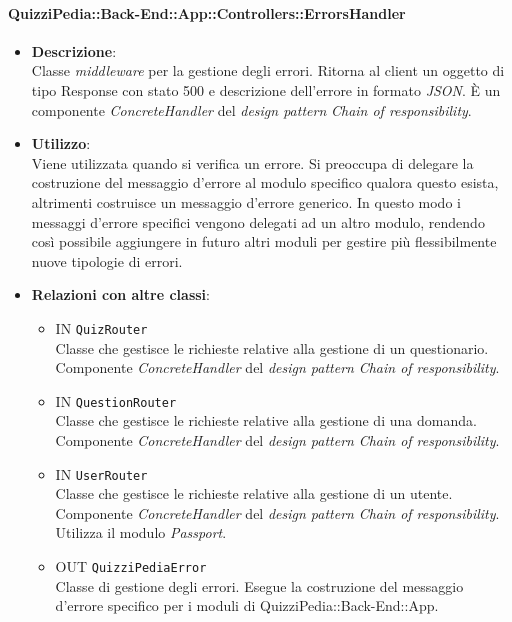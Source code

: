 \paragraph{QuizziPedia::Back-End::App::Controllers::ErrorsHandler}
\begin{itemize}
	\item \textbf{Descrizione}:\\
	Classe \textit{middleware} per la gestione degli errori. Ritorna al client un oggetto di tipo Response con stato  500 e descrizione dell'errore in formato \textit{JSON}. È un componente \textit{ConcreteHandler} del \textit{design pattern} \textit{Chain of responsibility}.
	\item \textbf{Utilizzo}:\\
	Viene utilizzata quando si verifica un errore. Si preoccupa di delegare la costruzione del messaggio d'errore al modulo specifico qualora questo esista, altrimenti costruisce un messaggio d'errore generico. In questo modo i messaggi d'errore specifici vengono delegati ad un altro modulo, rendendo così possibile aggiungere in futuro altri moduli per gestire più flessibilmente nuove tipologie di errori.
	\item \textbf{Relazioni con altre classi}:\\
	\begin{itemize}
		\item IN \texttt{QuizRouter}\\
		Classe che gestisce le richieste relative alla gestione di un questionario. Componente \textit{ConcreteHandler} del \textit{design pattern} \textit{Chain of responsibility}.
		\item IN \texttt{QuestionRouter}\\
		Classe che gestisce le richieste relative alla gestione di una domanda. Componente \textit{ConcreteHandler} del \textit{design pattern} \textit{Chain of responsibility}.
		\item IN \texttt{UserRouter}\\
		Classe che gestisce le richieste relative alla gestione di un utente. Componente \textit{ConcreteHandler} del \textit{design pattern} \textit{Chain of responsibility}. Utilizza il modulo \textit{Passport}.
		\item OUT \texttt{QuizziPediaError}\\
		Classe di gestione degli errori. Esegue la costruzione del messaggio d'errore specifico per i moduli di QuizziPedia::Back-End::App.

\end{itemize}
\end{itemize}
